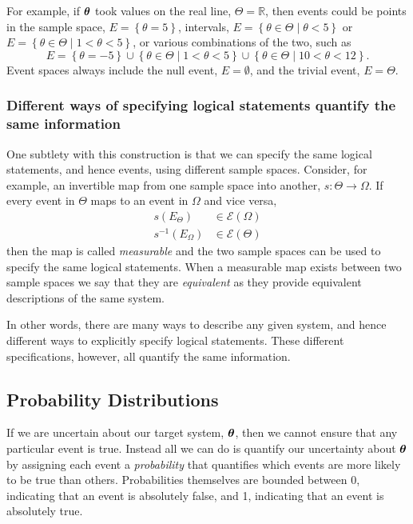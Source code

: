 \documentclass[11pt, oneside]{article}
\newcommand{\RR}{ \mathbb{R} }
\newcommand{\EV}[1]{\ensuremath { \mathcal{E} \! \left( #1 \right)  } }
\newcommand{\bt}{ \mbox{\boldmath{$\theta$}} }
\begin{document}
For example, if $\bt$ took values on the real line, $\Theta = \RR$, then 
events could be points in the sample space, $E = \left\{ \theta = 5 \right\}$, 
intervals, $E = \left\{ \theta \in \Theta \mid \theta < 5 \right\}$ or 
$E = \left\{ \theta \in \Theta \mid 1 < \theta < 5 \right\}$, or various
combinations of the two, such as
%
\begin{equation*}
E = 
\left\{ \theta = -5 \right\}
\cup
\left\{ \theta \in \Theta \mid 1 < \theta < 5 \right\}
\cup
\left\{ \theta \in \Theta \mid 10 < \theta < 12 \right\}.
\end{equation*}
%
Event spaces always include the null event, $E = \emptyset$, and the 
trivial event, $E = \Theta$.

\subsubsection*{Different ways of specifying logical statements quantify the same information}

One subtlety with this construction is that we can specify the
same logical statements, and hence events, using different 
sample spaces.  Consider, for example, an invertible map 
from one sample space into another, $s : \Theta \rightarrow \Omega$.  
If every event in $\Theta$ maps to an event in $\Omega$
and vice versa,
%
\begin{align*}
s \! \left( E_{\Theta} \right) &\in \EV{\Omega}
\\
s^{-1} \! \left( E_{\Omega} \right) &\in \EV{\Theta}
\end{align*}
%
then the map is called \emph{measurable} and the two
sample spaces can be used to specify the same logical 
statements.  When a measurable map exists between
two sample spaces we say that they are \emph{equivalent}
as they provide equivalent descriptions of the same system.

In other words, there are many ways to describe any given system,
and hence different ways to explicitly specify logical statements.
These different specifications, however, all quantify the same 
information.

\subsection{Probability Distributions}

If we are uncertain about our target system, $\bt$, then we cannot
ensure that any particular event is true.  Instead all we can do
is quantify our uncertainty about $\bt$ by assigning each event a
\emph{probability} that quantifies which events are more likely to
be true than others.  Probabilities themselves are bounded between 
0, indicating that an event is absolutely false, and 1, indicating that 
an event is absolutely true.
\end{document}
